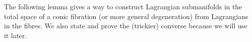 \documentclass{article}
\begin{document}
\begin{center}
\end{center}
The following lemma gives a way to construct Lagrangian submanifolds
in the total space of a conic fibration (or more general degeneration)
from Lagrangians in the fibres. We also state and prove the (trickier)
converse because we will use it later.
\end{document}
